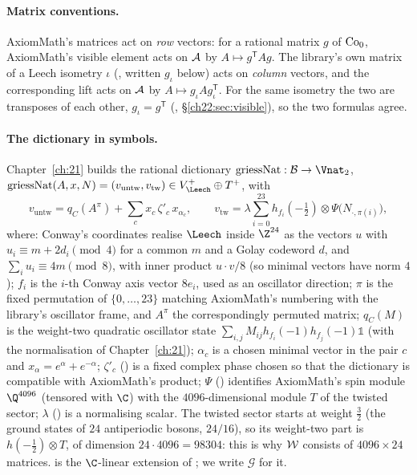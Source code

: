\paragraph{Matrix conventions.}  AxiomMath's matrices act on \emph{row} vectors: for a rational matrix $g$ of
$\mathrm{Co}_0$, AxiomMath's visible element acts on $\mathcal{A}$ by $A\mapsto g^{\mathsf T}Ag$.  The library's own
matrix of a Leech isometry $\iota$ (, written $g_\iota$ below) acts on \emph{column} vectors, and
the corresponding lift acts on $\mathcal{A}$ by $A\mapsto g_\iota Ag_\iota^{\mathsf T}$.  For the same isometry the two
are transposes of each other, $g_\iota=g^{\mathsf T}$ (, \S\ref{ch22:sec:visible}), so the two
formulas agree.

\paragraph{The dictionary in symbols.}  Chapter~\ref{ch:21} builds the rational dictionary
$\mathrm{griessNat}:\chtwentytwoB\to\Vnat_2$, $\mathrm{griessNat}(A,x,N)=(v_{\mathrm{untw}},v_{\mathrm{tw}})\in
V_\Leech^+\oplus T^+$, with
\begin{equation*}
  v_{\mathrm{untw}}=q_C(A^\pi)+\sum_{c}x_c\,\zeta'_c\,x_{\alpha_c},\qquad
  v_{\mathrm{tw}}=\lambda\sum_{i=0}^{23}h_{f_i}(-\tfrac12)\otimes\Psi\bigl(N_{\cdot,\pi(i)}\bigr),
\end{equation*}
where: Conway's coordinates realise $\Leech$ inside $\Z^{24}$ as the vectors $u$ with $u_i\equiv m+2d_i\pmod4$ for a
common $m$ and a Golay codeword $d$, and $\sum_iu_i\equiv4m\pmod8$, with inner product $u\cdot v/8$ (so minimal vectors
have norm $4$); $f_i$ is the $i$-th Conway axis vector $8e_i$, used as an oscillator direction; $\pi$ is the fixed
permutation of $\{0,\dots,23\}$ matching AxiomMath's numbering with the library's oscillator frame, and $A^\pi$ the
correspondingly permuted matrix; $q_C(M)$ is the weight-two quadratic oscillator state
$\sum_{i,j}M_{ij}h_{f_i}(-1)h_{f_j}(-1)\mathbb 1$ (with the normalisation of Chapter~\ref{ch:21}); $\alpha_c$ is a chosen
minimal vector in the pair $c$ and $x_\alpha=e^\alpha+e^{-\alpha}$; $\zeta'_c$ () is a fixed complex
phase chosen so that the dictionary is compatible with AxiomMath's product; $\Psi$ () identifies AxiomMath's
spin module $\Q^{4096}$ (tensored with $\C$) with the $4096$-dimensional module $T$ of the twisted sector; $\lambda$
() is a normalising scalar.  The twisted sector starts at weight $\tfrac32$ (the ground states of
$24$ antiperiodic bosons, $24/16$), so its weight-two part is $h(-\tfrac12)\otimes T$, of dimension $24\cdot4096=98304$:
this is why $\mathcal{W}$ consists of $4096\times24$ matrices.   is the $\C$-linear extension of
; we write $\mathcal G$ for it.

